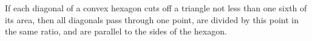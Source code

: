 If each diagonal of a convex hexagon cuts off a triangle not less than one sixth of its area, then all diagonals pass through one point, are divided by this point in the same ratio, and are parallel to the sides of the hexagon.
